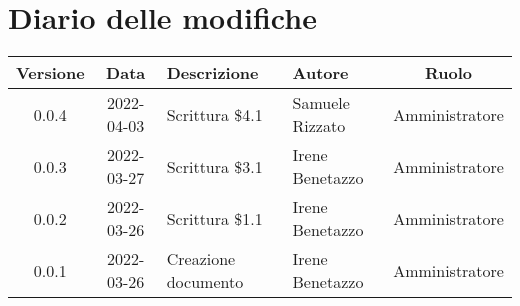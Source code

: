 \section*{Diario delle modifiche}
	\begin{center}
	\renewcommand{\arraystretch}{1.8} %
	\begin{tabular}{ |c|c|m{12em}|m{7em}|c| }
	\hline
	\textbf{Versione} & \textbf{Data} & \textbf{Descrizione} &  \textbf{Autore} &  \textbf{Ruolo} \\ %
	\hline
	0.0.4 & 2022-04-03 & Scrittura \$4.1 & Samuele \newline Rizzato & Amministratore\\ %
	\hline
	0.0.3 & 2022-03-27 & Scrittura \$3.1 & Irene Benetazzo & Amministratore\\
	\hline
	0.0.2 & 2022-03-26 & Scrittura \$1.1 & Irene Benetazzo & Amministratore\\
	\hline
    0.0.1 & 2022-03-26 & Creazione documento & Irene Benetazzo & Amministratore\\
	\hline
	\end{tabular}
	\end{center}
	\newpage